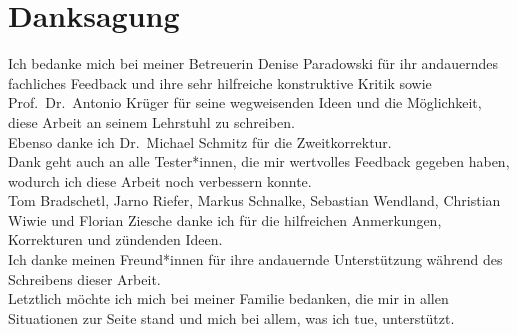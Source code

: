 \cleardoublepage\null

\vspace*{\fill}

\section*{\centering Danksagung}

\vspace*{6ex}

Ich bedanke mich bei meiner Betreuerin Denise Paradowski für
ihr andauerndes fachliches Feedback und ihre sehr hilfreiche konstruktive 
Kritik sowie
Prof.\ Dr.\ Antonio Krüger für seine wegweisenden Ideen und die
Möglichkeit, diese Arbeit an seinem Lehrstuhl zu schreiben.\\
Ebenso danke ich Dr.\ Michael Schmitz für die Zweitkorrektur.\\
Dank geht auch an alle Tester*innen, die mir wertvolles Feedback
gegeben haben, wodurch ich diese Arbeit noch verbessern konnte.\\
Tom Bradschetl, Jarno Riefer, Markus Schnalke, Sebastian Wendland,
Christian Wiwie und Florian Ziesche danke ich für die hilfreichen
Anmerkungen, Korrekturen und zündenden Ideen.\\
Ich danke meinen Freund*innen für ihre andauernde 
Unterstützung
während des Schreibens dieser Arbeit.\\
Letztlich möchte ich mich bei meiner Familie bedanken, die mir in allen
Situationen zur Seite stand und mich bei allem, was ich tue,
unterstützt.

\vspace*{\fill}